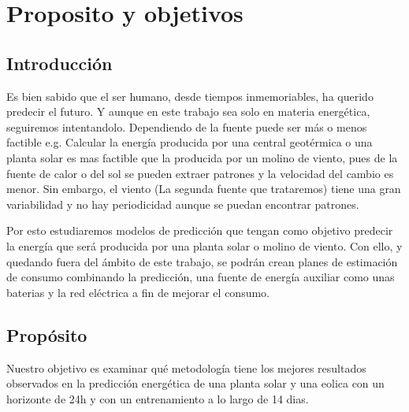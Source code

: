 \chapter{Proposito y objetivos}
\label{cha:introduccion}


\section{Introducción}

Es bien sabido que el ser humano, desde tiempos inmemoriables, ha querido predecir el futuro. Y aunque en este trabajo sea solo en materia energética, seguiremos intentandolo. Dependiendo de la fuente puede ser más o menos factible e.g. Calcular la energía producida por una central geotérmica o una planta solar es mas factible que la producida por un molino de viento, pues de la fuente de calor o del sol se pueden extraer patrones y la velocidad del cambio es menor. Sin embargo, el viento (La segunda fuente que trataremos) tiene una gran variabilidad y no hay periodicidad aunque se puedan encontrar patrones.

Por esto estudiaremos modelos de predicción que tengan como objetivo predecir la energía que será producida por una planta solar o molino de viento. Con ello, y quedando fuera del ámbito de este trabajo, se podrán crean planes de estimación de consumo combinando la predicción, una fuente de energía auxiliar como unas baterias y la red eléctrica a fin de mejorar el consumo.


\section{Propósito}

Nuestro objetivo es examinar qué metodología tiene los mejores resultados observados en la predicción energética de una planta solar y una eolica con un horizonte de 24h y con un entrenamiento a lo largo de 14 dias.

